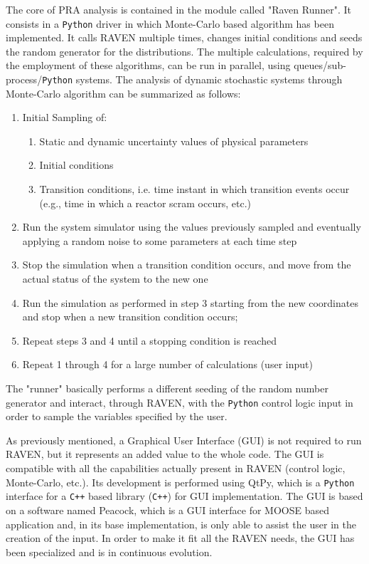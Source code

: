 \documentclass{anstrans}
\begin{document}
The core of PRA analysis is contained in the module called "Raven Runner". It consists in a \verb!Python! driver in which Monte-Carlo based algorithm has been implemented. It calls RAVEN multiple times, changes initial conditions and seeds the random generator for the distributions.
The multiple calculations, required by the employment of these algorithms, can be run in parallel, using queues/sub-process/\verb!Python! systems. The analysis of dynamic stochastic systems through Monte-Carlo algorithm can be summarized as follows:
\begin{enumerate}
\item Initial Sampling of:
       \begin{enumerate}
       \item Static and dynamic uncertainty values of physical parameters
       \item Initial conditions
       \item Transition conditions, i.e. time instant in which transition events occur (e.g., time in which a reactor scram occurs, etc.)
    \end{enumerate}
\item Run the system simulator using the values previously sampled and eventually applying a random noise to some parameters at each time step
\item Stop the simulation when a transition condition occurs, and move from the actual status of the system to the new one
\item Run the simulation as performed in step 3 starting from the new coordinates and stop when a new transition condition occurs;
\item Repeat steps 3 and 4 until a stopping condition is reached
\item Repeat 1 through 4 for a large number of calculations (user input)
\end{enumerate}
The "runner" basically performs a different seeding of the random number generator and interact, through RAVEN, with the \verb!Python! control logic input in order to sample the variables specified by the user.

As previously mentioned, a Graphical User Interface (GUI) is not required to run RAVEN, but it represents an added value to the whole code. The GUI is compatible with all the capabilities actually present in RAVEN (control logic, Monte-Carlo, etc.).  Its development is performed using QtPy, which is a \verb!Python! interface for a \verb!C++! based library (\verb!C++!) for GUI implementation. The GUI is based on a software named Peacock, which is a GUI interface for MOOSE based application and, in its base implementation, is only able to assist the user in the creation of the input.  In order to make it fit all the RAVEN needs, the GUI has been specialized and is in continuous evolution.
\end{document}
